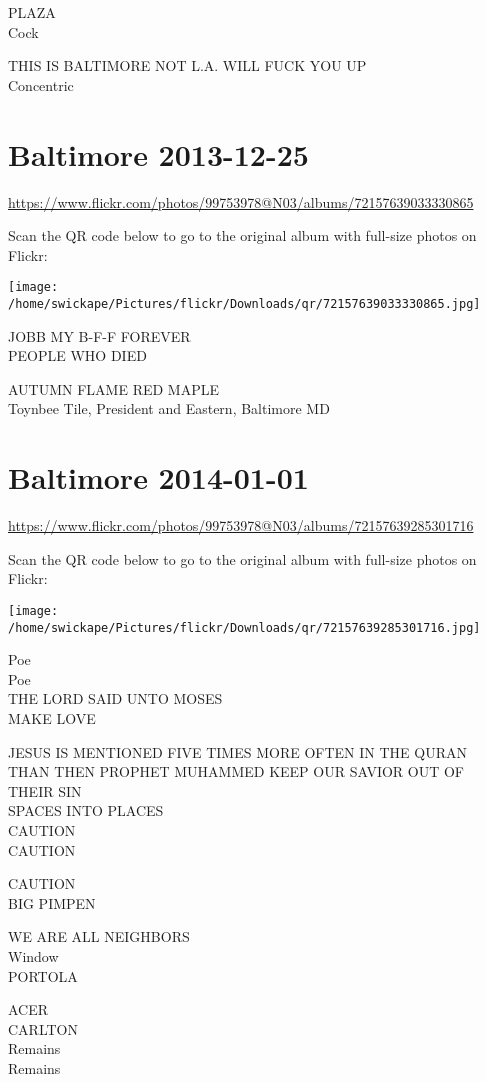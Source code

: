 \documentclass[10pt,letterpaper]{article}
\begin{document}
PLAZA\\
Cock

THIS IS BALTIMORE NOT L.A. WILL FUCK YOU UP\\
Concentric
\pagebreak

\section*{Baltimore 2013-12-25}

\url{https://www.flickr.com/photos/99753978@N03/albums/72157639033330865}

Scan the QR code below to go to the original album with full-size photos on Flickr:

\texttt{[image: /home/swickape/Pictures/flickr/Downloads/qr/72157639033330865.jpg]}
\pagebreak

JOBB MY B{-}F{-}F FOREVER\\
PEOPLE WHO DIED

AUTUMN FLAME RED MAPLE\\
Toynbee Tile, President and Eastern, Baltimore MD
\pagebreak

\section*{Baltimore 2014-01-01}

\url{https://www.flickr.com/photos/99753978@N03/albums/72157639285301716}

Scan the QR code below to go to the original album with full-size photos on Flickr:

\texttt{[image: /home/swickape/Pictures/flickr/Downloads/qr/72157639285301716.jpg]}
\pagebreak

Poe\\
Poe\\
THE LORD SAID UNTO MOSES\\
MAKE LOVE

JESUS IS MENTIONED FIVE TIMES MORE OFTEN IN THE QURAN THAN THEN PROPHET MUHAMMED KEEP OUR SAVIOR OUT OF THEIR SIN\\
SPACES INTO PLACES\\
CAUTION\\
CAUTION

CAUTION\\
BIG PIMPEN

WE ARE ALL NEIGHBORS\\
Window\\
PORTOLA

ACER\\
CARLTON\\
Remains\\
Remains
\end{document}
